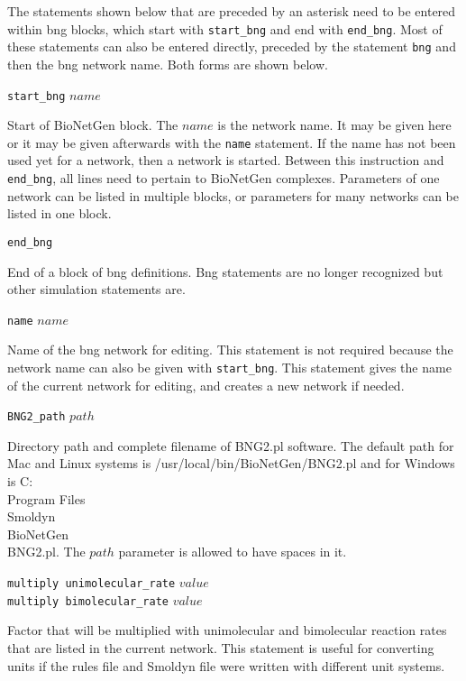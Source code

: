 \documentclass {scrbook}
\newcommand {\ttt} {\texttt}
\begin{document}
The statements shown below that are preceded by an asterisk need to be entered within bng blocks, which start with \ttt{start\_bng} and end with \ttt{end\_bng}. Most of these statements can also be entered directly, preceded by the statement \ttt{bng} and then the bng network name. Both forms are shown below.

\begin{description}

\item{\ttt{start\_bng} $name$}

Start of BioNetGen block. The $name$ is the network name. It may be given here or it may be given afterwards with the \ttt{name} statement. If the name has not been used yet for a network, then a network is started. Between this instruction and \ttt{end\_bng}, all lines need to pertain to BioNetGen complexes. Parameters of one network can be listed in multiple blocks, or parameters for many networks can be listed in one block.

\item{\ttt{end\_bng}}

End of a block of bng definitions. Bng statements are no longer recognized but other simulation statements are.

\item{\ttt{name} $name$}

Name of the bng network for editing. This statement is not required because the network name can also be given with \ttt{start\_bng}. This statement gives the name of the current network for editing, and creates a new network if needed.

\item{\ttt{BNG2\_path} $path$}

Directory path and complete filename of BNG2.pl software. The default path for Mac and Linux systems is /usr/local/bin/BioNetGen/BNG2.pl and for Windows is C:\\Program Files\\Smoldyn\\BioNetGen\\BNG2.pl. The $path$ parameter is allowed to have spaces in it.

\item{\ttt{multiply unimolecular\_rate} $value$\\
\ttt{multiply bimolecular\_rate} $value$}

Factor that will be multiplied with unimolecular and bimolecular reaction rates that are listed in the current network. This statement is useful for converting units if the rules file and Smoldyn file were written with different unit systems.


\end{description}
\end{document}
